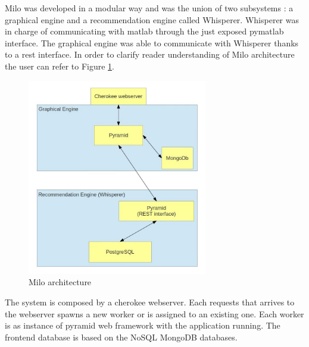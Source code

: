 Milo was developed in a modular way and was the union of two subsystems \cite{thesis-andreia}: a graphical engine and a recommendation engine called Whisperer. Whisperer was in charge of communicating with matlab through the just exposed pymatlab interface. The graphical engine was able to communicate with Whisperer thanks to a rest interface. In order to clarify reader understanding of Milo architecture the user can refer to Figure \ref{fig:milo_architecture}.

\begin{figure}
  \centering
  \includegraphics[width=0.7\textwidth]{figures/milo_architecture.jpg}
  \caption{Milo architecture}
  \label{fig:milo_architecture}
\end{figure}

The system is composed by a cherokee webserver. Each requests that arrives to the webserver spawns a new worker or is assigned to an existing one. Each worker is as instance of pyramid web framework with the application running. The frontend database is based on the NoSQL \cite{nosql} MongoDB \cite{mongodb} databases.

